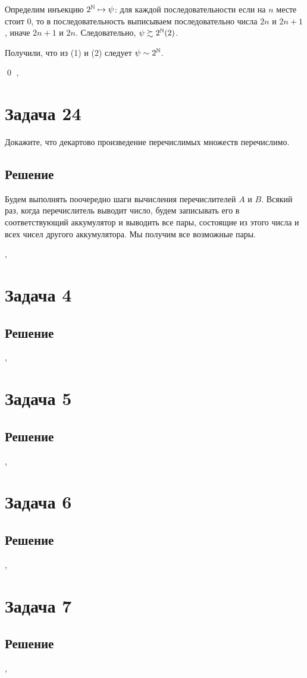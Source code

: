 \documentclass[a4paper,12pt]{article}
\begin{document}
	Определим инъекцию $2^{\mathbb{N}} \mapsto \psi$: для каждой последовательности если на $n$ месте стоит 0, то в последовательность выписываем последовательно числа $2n$ и $2n + 1$, иначе $2n + 1$ и $2n$. Следовательно, $\psi \succsim 2^{\mathbb{N}} (2)$.
	
	Получили, что из (1) и (2) следует $\psi \sim 2^{\mathbb{N}}$.
	
	
	\qed
	\sep
	\section*{Задача 24}
	Докажите, что декартово произведение перечислимых множеств перечислимо.
	\subsection*{Решение}
	
	Будем выполнять поочередно шаги вычисления перечислителей $A$ и $B$. Всякий раз, когда перечислитель выводит число, будем записывать его в соответствующий аккумулятор и выводить все пары, состоящие из этого числа и всех чисел другого аккумулятора. Мы получим все возможные пары.
	
	\sep	
	
	\section*{Задача 4}

	\subsection*{Решение}


	\sep	
	
	\section*{Задача 5}
	
	\subsection*{Решение}
	
	

	\sep	
		
		
	\section*{Задача 6}

	
	\subsection*{Решение}
	


	\sep		
	
	
	
	
	\section*{Задача 7}

	
	\subsection*{Решение}
	


	\sep	
	
	
	
	
\end{document}
